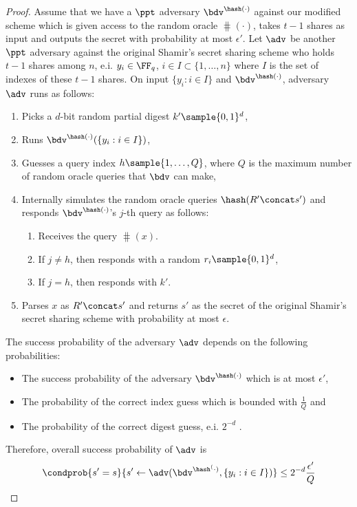 \documentclass[envcountsame,runningheads,notitlepage]{llncs}
\begin{document}
	\begin{proof}
		Assume that we have a $\ppt$ adversary  $\bdv^{\hash(\cdot)}$ against our modified scheme which is given access to the random oracle $\hash(\cdot)$, takes $t-1$ shares as input and outputs the secret with probability at most $\epsilon'$.
		Let $\adv$ be another $\ppt$ adversary against the original Shamir's secret sharing scheme who holds $t-1$ shares among $n$, e.i. $y_i \in \FF_q$, $i \in I \subset \{1, \ldots, n\}$ where $I$ is the set of indexes of these $t-1$ shares.
		On input $\{y_i: i \in I\}$ and  $\bdv^{\hash(\cdot)}$, adversary $\adv$ runs as follows:
		\begin{enumerate}
		 	\item Picks a $d$-bit random partial digest $k' \sample \{0,1\}^{d}$,
		 	\item Runs $\bdv^{\hash(\cdot)}(\{y_i: i \in I\})$, 
		 	\item Guesses a query index $h \sample \{1, \ldots, Q\}$, where $Q$ is the maximum number of random oracle queries that $\bdv$ can make,
		 	\item Internally simulates the random oracle queries $\hash(R'\concat s')$ and responds $\bdv^{\hash(\cdot)}$'s $j$-th query as follows:
		 	\begin{enumerate}
		 		\item Receives the query $\hash(x)$.
		 		\item If $j \neq h$, then responds with a random $r_i \sample \{0,1\}^{d}$,
		 		\item If $j = h$, then responds with $k'$.
		 	\end{enumerate}
	 		\item Parses $x$ as $R'\concat s'$ and returns $s'$ as the secret of the original Shamir's secret sharing scheme with probability at most $\epsilon$.
		\end{enumerate} 
		The success probability of the adversary $\adv$ depends on the following probabilities:
		\begin{itemize}
		 	\item The success probability of the adversary $\bdv^{\hash(\cdot)}$ which is at most $\epsilon'$,
		 	\item The probability of the correct index guess which is bounded with $\frac{1}{Q}$ and 
		 	\item The probability of the correct digest guess, e.i. $2^{-d}$ .
		\end{itemize}
		
		Therefore, overall success probability of $\adv$ is 
		\begin{equation*}
			\condprob{s' = s}{s' \leftarrow \adv(\bdv^{\hash^(\cdot)}, \{y_i: i \in I\})} \leq 2^{-d}\frac{\epsilon'}{Q}
		\end{equation*}
		 

\end{proof}
\end{document}
